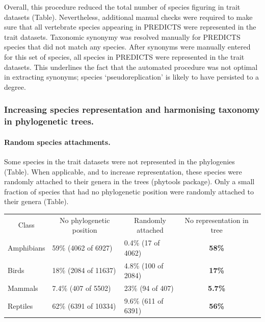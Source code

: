 Overall, this procedure reduced the total number of species figuring in trait datasets (Table). Nevertheless, additional manual checks were required to make sure that all vertebrate species appearing in PREDICTS were represented in the trait datasets. Taxonomic synonymy was resolved manually for PREDICTS species that did not match any species. After synonyms were manually entered for this set of species, all species in PREDICTS were represented in the trait datasets. This underlines the fact that the automated procedure was not optimal in extracting synonyms; species `pseudoreplication' is likely to have persisted to a degree. 



\subsubsection{Increasing species representation and harmonising taxonomy in phylogenetic trees.}

\paragraph{Random species attachments.} Some species in the trait datasets were not represented in the phylogenies (Table). When applicable, and to increase representation, these species were randomly attached to their genera in the trees (phytools package). Only a small fraction of species that had no phylogenetic position were randomly attached to their genera (Table).

\begin{table}[h!]
\begin{tabular}{|l|l|l|c|l}
\cline{1-4}
\multicolumn{1}{|c|}{Class} & \multicolumn{1}{c|}{No phylogenetic position} & \multicolumn{1}{c|}{Randomly attached} & No representation in tree &  \\ \cline{1-4}
Amphibians                  & 59\% (4062 of 6927)                           & 0.4\% (17 of 4062)                     & \textbf{58\%}             &  \\ \cline{1-4}
Birds                       & 18\% (2084 of 11637)                          & 4.8\% (100 of 2084)                    & \textbf{17\%}             &  \\ \cline{1-4}
Mammals                     & 7.4\% (407 of 5502)                           & 23\% (94 of 407)                       & \textbf{5.7\%}            &  \\ \cline{1-4}
Reptiles                    & 62\% (6391 of 10334)                          & 9.6\% (611 of 6391)                    & \textbf{56\%}             &  \\ \cline{1-4}
\end{tabular}
\end{table}

